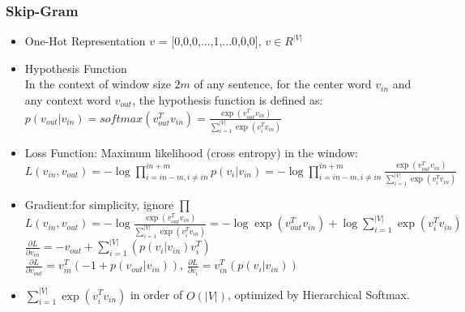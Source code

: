 \begin{frame}
\frametitle{Skip-Gram}
	\small
	\begin{itemize}
		\item One-Hot Representation	
			$v$ = [0,0,0,...,1,...0,0,0], $v\in R^{|V|}$
		\item Hypothesis Function \\
			In the context of window size $2m$ of any sentence, for the center word $v_{in}$ and any context word $v_{out}$,
			the hypothesis function is defined as:
			\\\hspace{1cm}$p(v_{out}|v_{in})=softmax(v_{out}^Tv_{in})=\frac{\exp(v_{out}^Tv_{in})}{\sum_{i=1}^{|V|}\exp(v_i^Tv_{in})}$
		\item Loss Function: 
			Maximum likelihood (cross entropy) in the window:
			\\$L(v_{in},v_{out})=-\log \prod _{i=in-m, i\neq in}^{in+m}p(v_{i}|v_{in})
				=-\log \prod _{i=in-m, i\neq in}^{in+m}\frac{\exp(v_{out}^Tv_{in})}{\sum_{i=1}^{|V|}\exp(v_i^Tv_{in})}$
		\item Gradient:for simplicity, ignore $\prod$
			\\$L(v_{in},v_{out})=-\log\frac{\exp(v_{out}^Tv_{in})}{\sum_{i=1}^{|V|}\exp(v_i^Tv_{in})}=-\log\exp(v_{out}^Tv_{in}) + \log\sum_{i=1}^{|V|}\exp(v_i^Tv_{in})$ 
		\\ \hspace{1cm}$\frac{\partial{L}}{\partial{v_{in}}}=-v_{out}+\sum_{i=1}^{|V|}(p(v_{i}|v_{in})v_{i}^T)$
		 \\\hspace{1cm}$\frac{\partial{L}}{\partial{v_{out}}}=v_{in}^T(-1+p(v_{out}|v_{in}))$,
		\hspace{1cm}$\frac{\partial{L}}{\partial{v_{i}}}=v_{in}^T(p(v_{i}|v_{in}))$
		\item $\sum_{i=1}^{|V|}\exp(v_i^Tv_{in})$ in order of $O(|V|)$, optimized by Hierarchical Softmax.
	\end{itemize}
\end{frame}
